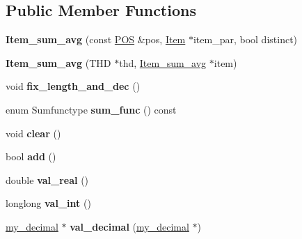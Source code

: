 \subsection*{Public Member Functions}
\begin{DoxyCompactItemize}
\item 
\mbox{\label{classItem__sum__avg_a54ca042462b6f4d9c5021beb0448fe74}} 
{\bfseries Item\+\_\+sum\+\_\+avg} (const \mbox{\hyperlink{structYYLTYPE}{P\+OS}} \&pos, \mbox{\hyperlink{classItem}{Item}} $\ast$item\+\_\+par, bool distinct)
\item 
\mbox{\label{classItem__sum__avg_afc7c4900aaf47547dfa3be9e6610d74b}} 
{\bfseries Item\+\_\+sum\+\_\+avg} (T\+HD $\ast$thd, \mbox{\hyperlink{classItem__sum__avg}{Item\+\_\+sum\+\_\+avg}} $\ast$item)
\item 
\mbox{\label{classItem__sum__avg_af7fd1fc2f657ac6b81be6a98a692aa00}} 
void {\bfseries fix\+\_\+length\+\_\+and\+\_\+dec} ()
\item 
\mbox{\label{classItem__sum__avg_aba199f734897100d7a0319724e22038d}} 
enum Sumfunctype {\bfseries sum\+\_\+func} () const
\item 
\mbox{\label{classItem__sum__avg_a89422ffe67f64c2bd74526701f40c1dd}} 
void {\bfseries clear} ()
\item 
\mbox{\label{classItem__sum__avg_a54bd55346d2111ea9816289ee079e9f3}} 
bool {\bfseries add} ()
\item 
\mbox{\label{classItem__sum__avg_a59d3a91c9bde72f1b67a9212f55aec7b}} 
double {\bfseries val\+\_\+real} ()
\item 
\mbox{\label{classItem__sum__avg_a1d03d53b0557f14f4757b8c2ad19c5c8}} 
longlong {\bfseries val\+\_\+int} ()
\item 
\mbox{\label{classItem__sum__avg_a5c722e80665ba5c188ecd2d9c05c8cd0}} 
\mbox{\hyperlink{classmy__decimal}{my\+\_\+decimal}} $\ast$ {\bfseries val\+\_\+decimal} (\mbox{\hyperlink{classmy__decimal}{my\+\_\+decimal}} $\ast$)
\item 

\end{DoxyCompactItemize}
